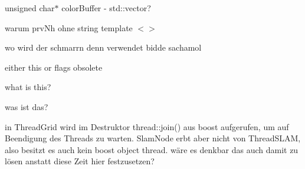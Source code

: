 \begin{DoxyRefList}
unsigned char$\ast$ color\-Buffer -\/ std\-::vector?  
\item[\label{todo__todo000016}%
\hypertarget{todo__todo000016}{}%
Member \hyperlink{classohm__tsd__slam__ref_1_1ThreadGrid_a23ff222ecd6e64afde2e8c926e40889c}{ohm\-\_\-tsd\-\_\-slam\-\_\-ref\-:\-:Thread\-Grid\-:\-:Thread\-Grid} (obvious\-::\-Tsd\-Grid $\ast$grid, ros\-::\-Node\-Handle $\ast$const nh, const double x\-Offset, const double y\-Offset)]warum prv\-Nh ohne string template $<$$>$  
\item[\label{todo__todo000022}%
\hypertarget{todo__todo000022}{}%
Member \hyperlink{classohm__tsd__slam__ref_1_1ThreadLocalize_a45c7b109a3a9f22e0c60111c58eb0dd3}{ohm\-\_\-tsd\-\_\-slam\-\_\-ref\-:\-:Thread\-Localize\-:\-:\-\_\-assigner} ]wo wird der schmarrn denn verwendet bidde sachamol  
\item[\label{todo__todo000020}%
\hypertarget{todo__todo000020}{}%
Member \hyperlink{classohm__tsd__slam__ref_1_1ThreadLocalize_ad1b612e37ab54ffe1958cac7d5f9c89c}{ohm\-\_\-tsd\-\_\-slam\-\_\-ref\-:\-:Thread\-Localize\-:\-:\-\_\-data\-Mutex} ]either this or flags obsolete  
\item[\label{todo__todo000023}%
\hypertarget{todo__todo000023}{}%
Member \hyperlink{classohm__tsd__slam__ref_1_1ThreadLocalize_a4444f42e17414907a35919adc4904268}{ohm\-\_\-tsd\-\_\-slam\-\_\-ref\-:\-:Thread\-Localize\-:\-:\-\_\-filter\-Reciprocal} ]what is this?  
\item[\label{todo__todo000021}%
\hypertarget{todo__todo000021}{}%
Member \hyperlink{classohm__tsd__slam__ref_1_1ThreadLocalize_a2e9f4af9a78a5c16b1a4966b1e28a27b}{ohm\-\_\-tsd\-\_\-slam\-\_\-ref\-:\-:Thread\-Localize\-:\-:\-\_\-ran\-Eps\-Thresh} ]was ist das?  
\item[\label{todo__todo000007}%
\hypertarget{todo__todo000007}{}%
Member \hyperlink{SlamNode_8h_a502d892a0b86363c94e2f11fb2370346}{T\-H\-R\-E\-A\-D\-\_\-\-T\-E\-R\-M\-\_\-\-M\-S} ]in Thread\-Grid wird im Destruktor thread\-::join() aus boost aufgerufen, um auf Beendigung des Threads zu warten. Slam\-Node erbt aber nicht von Thread\-S\-L\-A\-M, also besitzt es auch kein boost object thread. wäre es denkbar das auch damit zu lösen anstatt diese Zeit hier festzusetzen? 
\end{DoxyRefList}